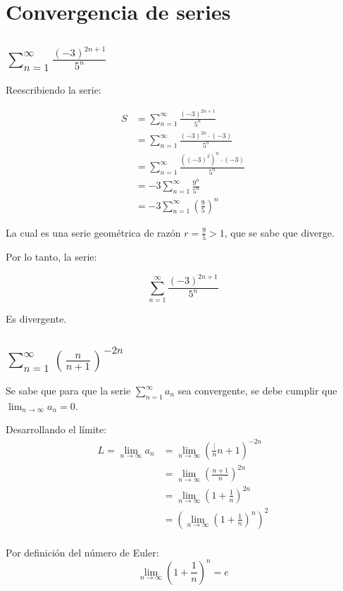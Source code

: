 \documentclass{article}
\begin{document}
\section{Convergencia de series}

\subsection{$\sum_{n = 1}^{\infty} \frac{(-3)^{2n + 1}}{5^n}$}

Reescribiendo la serie:

\begin{align*}
S &= \sum_{n = 1}^{\infty} \frac{(-3)^{2n + 1}}{5^n} \\
&= \sum_{n = 1}^{\infty} \frac{(-3)^{2n} \cdot (-3) }{5^n} \\
&= \sum_{n = 1}^{\infty} \frac{\left((-3)^2\right)^n \cdot (-3) }{5^n} \\
&= -3 \sum_{n = 1}^{\infty} \frac{9^n}{5^n}\\
&= -3 \sum_{n = 1}^{\infty} \left( \frac{9}{5} \right)^n
\end{align*}

La cual es una serie geométrica de razón $r = \frac{9}{5} > 1$, que se sabe que diverge.

Por lo tanto, la serie:

\[
\sum_{n = 1}^{\infty} \frac{(-3)^{2n + 1}}{5^n}
\]

Es divergente.

\subsection{$\sum_{n = 1}^{\infty} \left( \frac{n}{n + 1} \right)^{-2n} $}

Se sabe que para que la serie $\sum_{n = 1}^{\infty} a_n$ sea convergente, se debe cumplir que $\lim_{n \to \infty} a_n = 0$. 

Desarrollando el límite:
\begin{align*}
L = \lim_{n \to \infty} a_n &= \lim_{n \to \infty} \left( \frac|{n}{n + 1} \right)^{-2n} \\
&= \lim_{n \to \infty} \left( \frac{n + 1}{n} \right)^{2n} \\
&= \lim_{n \to \infty} \left( 1 + \frac{1}{n} \right)^{2n} \\
&= \left(\lim_{n \to \infty} \left( 1 + \frac{1}{n} \right)^{n} \right)^2 \\
\end{align*}

Por definición del número de Euler:
\[
\lim_{n \to \infty} \left( 1 + \frac{1}{n} \right)^{n} = e
\]
\end{document}

